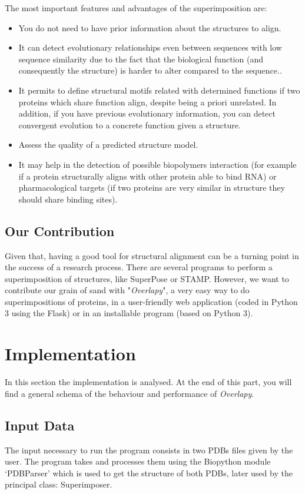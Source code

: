 \documentclass{article}
\begin{document}
The most important features and advantages of the superimposition are:
\begin{itemize}
  \item You do not need to have prior information about the structures to align\cite{2}.
  \item It can detect evolutionary relationships even between sequences with low sequence similarity due to the fact that the biological function (and consequently the structure) is harder to alter compared to the sequence.\cite{3}.
  \item It permits to define structural motifs related with determined functions if two proteins which share function align, despite being a priori unrelated. In addition, if you have previous evolutionary information, you can detect convergent evolution to a concrete function given a structure\cite{4}.
  \item Assess the quality of a predicted structure model\cite{1}.
  \item It may help in the detection of possible biopolymers interaction (for example if a protein structurally aligns with other protein able to bind RNA) or pharmacological targets (if two proteins are very similar in structure they should share binding sites)\cite{5}. 
\end{itemize} 

\subsection*{\color{gray}Our Contribution}
Given that, having a good tool for structural alignment can be a turning point in the success of a research process. There are several programs to perform a superimposition of structures, like SuperPose\cite{6} or STAMP\cite{7}. However, we want to contribute our grain of sand with "\textit{Overlapy}", a very easy way to do superimpositions of proteins, in a user-friendly web application\cite{8} (coded in Python 3 using the Flask\cite{9}) or in an installable program\cite{10} (based on Python 3\cite{11}).

\pagebreak
\section*{Implementation}

In this section the implementation is analysed. At the end of this part, you will find a general schema of the behaviour and performance of \textit{Overlapy}.

\subsection*{\color{gray}Input Data}
The input necessary to run the program consists in two PDBs files given by the user. The program takes and processes them using the Biopython module `PDBParser' which is used to get the structure of both PDBs, later used by the principal class: Superimposer.
\end{document}
